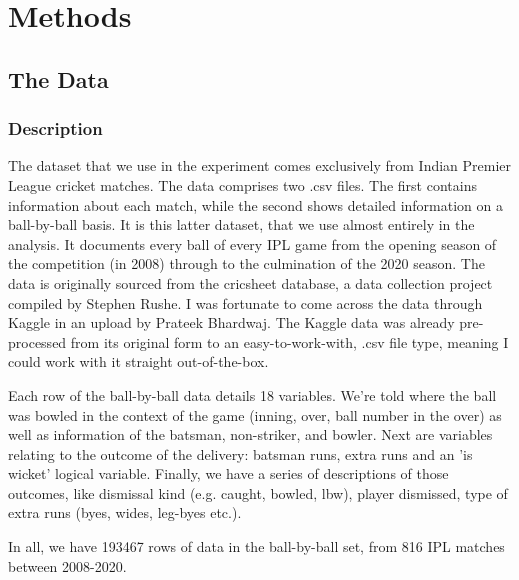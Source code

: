 \titleformat{\chapter}[hang]{\Huge\bfseries}{\thechapter\hsp\textcolor{gray75}{|}\hsp}{0pt}{\Huge\bfseries}
\chapter{Methods}

\section{The Data}

\subsection{Description}

The dataset that we use in the experiment comes exclusively from Indian Premier League cricket matches. The data comprises two .csv files. The first contains information about each match, while the second shows detailed information on a ball-by-ball basis. It is this latter dataset, that we use almost entirely in the analysis. It documents every ball of every IPL game from the opening season of the competition (in 2008) through to the culmination of the 2020 season. The data is originally sourced from the cricsheet database, \cite{rushe_cricsheet_nodate} a data collection project compiled by Stephen Rushe. I was fortunate to come across the data through Kaggle \cite{bhardwaj_ipl_nodate} in an upload by Prateek Bhardwaj. The Kaggle data was already pre-processed from its original form to an easy-to-work-with, .csv file type, meaning I could work with it straight out-of-the-box.

Each row of the ball-by-ball data details 18 variables. We're told where the ball was bowled in the context of the game (inning, over, ball number in the over) as well as information of the batsman, non-striker, and bowler. Next are variables relating to the outcome of the delivery: batsman runs, extra runs and an 'is wicket' logical variable. Finally, we have a series of descriptions of those outcomes, like dismissal kind (e.g. caught, bowled, lbw), player dismissed, type of extra runs (byes, wides, leg-byes etc.).

In all, we have 193467 rows of data in the ball-by-ball set, from 816 IPL matches between 2008-2020.\footnotemark{}


